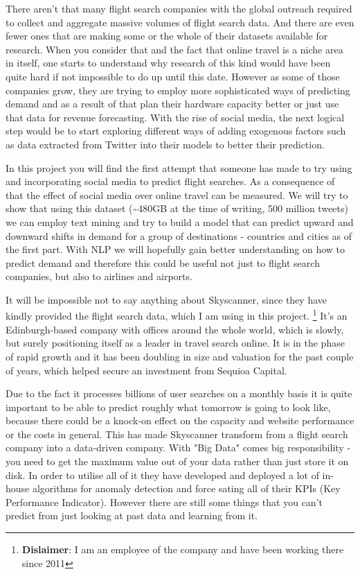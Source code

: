 \documentclass[minf,frontabs,twoside,singlespacing,parskip]{infthesis}
\begin{document}
There aren't that many flight search companies with the global outreach required to collect and aggregate massive volumes of flight search data. And there are even fewer ones that are making some or the whole of their datasets available for research. When you consider that and the fact that online travel is a niche area in itself, one starts to understand why research of this kind would have been quite hard if not impossible to do up until this date. However as some of those companies grow, they are trying to employ more sophisticated ways of predicting demand and as a result of that plan their hardware capacity better or just use that data for revenue forecasting. With the rise of social media, the next logical step would be to start exploring different ways of adding exogenous factors such as data extracted from Twitter into their models to better their prediction. 


In this project you will find the first attempt that someone has made to try using and incorporating social media to predict flight searches. As a consequence of that the effect of social media over online travel can be measured. We will try to show that using this dataset (\textasciitilde 480GB at the time of writing, 500 million tweets) we can employ text mining and try to build a model that can predict upward and downward shifts in demand for a group of destinations - countries and cities as of the first part. With NLP we will hopefully gain better understanding on how to predict demand and therefore this could be useful not just to flight search companies, but also to airlines and airports. 


It will be impossible not to say anything about Skyscanner, since they have kindly provided the flight search data, which I am using in this project. \footnote{\textbf{Dislaimer}: I am an employee of the company and have been working there since 2011} It's an Edinburgh-based company with offices around the whole world, which is slowly, but surely positioning itself as a leader in travel search online. It is in the phase of rapid growth and it has been doubling in size and valuation for the past couple of years, which helped secure an investment from Sequioa Capital. \cite{seqcap}


Due to the fact it processes billions of user searches on a monthly basis it is quite important to be able to predict roughly what tomorrow is going to look like, because there could be a knock-on effect on the capacity and website performance or the costs in general. This has made Skyscanner transform from a flight search company into a data-driven company. With "Big Data" comes big responsibility - you need to get the maximum value out of your data rather than just store it on disk. In order to utilise all of it they have developed and deployed a lot of in-house algorithms for anomaly detection and force sating all of their KPIs (Key Performance Indicator). However there are still some things that you can't predict from just looking at past data and learning from it.
\end{document}
